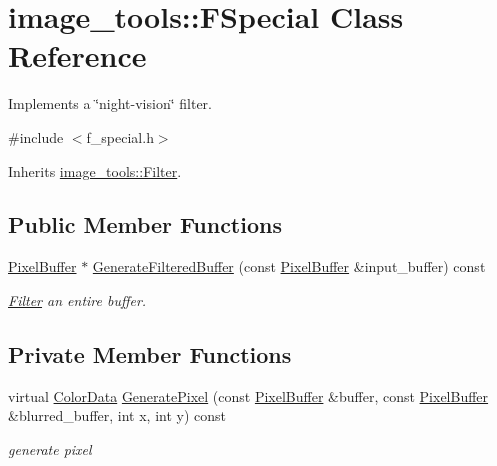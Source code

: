 \hypertarget{classimage__tools_1_1FSpecial}{}\section{image\+\_\+tools\+:\+:F\+Special Class Reference}
\label{classimage__tools_1_1FSpecial}


Implements a \char`\"{}night-\/vision\char`\"{} filter.  




{\ttfamily \#include $<$f\+\_\+special.\+h$>$}



Inherits \hyperlink{classimage__tools_1_1Filter}{image\+\_\+tools\+::\+Filter}.

\subsection*{Public Member Functions}
\begin{DoxyCompactItemize}
\item 
\hyperlink{classimage__tools_1_1PixelBuffer}{Pixel\+Buffer} $\ast$ \hyperlink{classimage__tools_1_1FSpecial_a31941fa317995cabd039469f2481089f}{Generate\+Filtered\+Buffer} (const \hyperlink{classimage__tools_1_1PixelBuffer}{Pixel\+Buffer} \&input\+\_\+buffer) const 
\begin{DoxyCompactList}\small\item\em \hyperlink{classimage__tools_1_1Filter}{Filter} an entire buffer. \end{DoxyCompactList}\end{DoxyCompactItemize}
\subsection*{Private Member Functions}
\begin{DoxyCompactItemize}
\item 
virtual \hyperlink{classimage__tools_1_1ColorData}{Color\+Data} \hyperlink{classimage__tools_1_1FSpecial_a0b429e2d6bc2ecba6e4e10941d0fd63e}{Generate\+Pixel} (const \hyperlink{classimage__tools_1_1PixelBuffer}{Pixel\+Buffer} \&buffer, const \hyperlink{classimage__tools_1_1PixelBuffer}{Pixel\+Buffer} \&blurred\+\_\+buffer, int x, int y) const \hypertarget{classimage__tools_1_1FSpecial_a0b429e2d6bc2ecba6e4e10941d0fd63e}{}\label{classimage__tools_1_1FSpecial_a0b429e2d6bc2ecba6e4e10941d0fd63e}

\begin{DoxyCompactList}\small\item\em generate pixel \end{DoxyCompactList}\end{DoxyCompactItemize}


